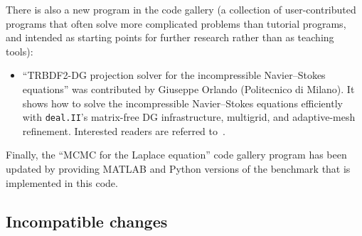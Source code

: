 \documentclass{ansarticle-preprint}
\newcommand{\specialword}[1]{\texttt{#1}}
\newcommand{\dealii}{{\specialword{deal.II}}\xspace}
\begin{document}
There is also a new program in the code gallery (a collection of
user-contributed programs that often solve more complicated problems
than tutorial programs, and intended as starting points for further
research rather than as teaching tools):
\begin{itemize}
  \item ``TRBDF2-DG projection solver for the incompressible Navier--Stokes equations'' was contributed by Giuseppe Orlando (Politecnico di Milano). It shows
  how to solve the incompressible Navier--Stokes equations efficiently 
  with \dealii{}'s matrix-free DG infrastructure, multigrid, and adaptive-mesh
  refinement. Interested readers are referred to~\cite{orlando2021efficient}.
\end{itemize}
Finally, the ``MCMC for the Laplace equation'' code gallery
program has been updated by providing MATLAB and Python versions of
the benchmark that is implemented in this code.



\subsection{Incompatible changes}\label{subsec:deprecated}
\end{document}
